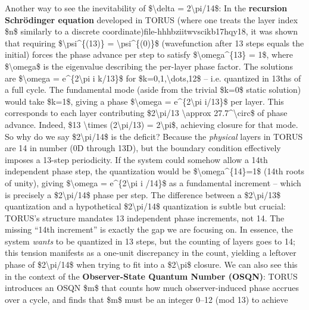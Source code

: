 \documentclass[
]{article}
\begin{document}
Another way to see the inevitability of \$\textbackslash delta =
2\textbackslash pi/14\$: In the \textbf{recursion Schrödinger equation}
developed in TORUS (where one treats the layer index \$n\$ similarly to
a discrete coordinate)\hspace{0pt}file-hhhbziitwvscikb17hqy18, it was
shown that requiring \$\textbackslash psi\^{}\{(13)\} =
\textbackslash psi\^{}\{(0)\}\$ (wavefunction after 13 steps equals the
initial) forces the phase advance per step to satisfy
\$\textbackslash omega\^{}\{13\} = 1\$, where \$\textbackslash omega\$
is the eigenvalue describing the per-layer phase factor\hspace{0pt}. The
solutions are \$\textbackslash omega = e\^{}\{2\textbackslash pi i
k/13\}\$ for \$k=0,1,\textbackslash dots,12\$ -- i.e. quantized in 13ths
of a full cycle. The fundamental mode (aside from the trivial \$k=0\$
static solution) would take \$k=1\$, giving a phase
\$\textbackslash omega = e\^{}\{2\textbackslash pi i/13\}\$ per
layer\hspace{0pt}. This corresponds to each layer contributing
\$2\textbackslash pi/13 \textbackslash approx
27.7\^{}\textbackslash circ\$ of phase advance. Indeed, \$13
\textbackslash times (2\textbackslash pi/13) = 2\textbackslash pi\$,
achieving closure for that mode. So why do we say
\$2\textbackslash pi/14\$ is the deficit? Because the \emph{physical}
layers in TORUS are 14 in number (0D through 13D), but the boundary
condition effectively imposes a 13-step periodicity. If the system could
somehow allow a 14th independent phase step, the quantization would be
\$\textbackslash omega\^{}\{14\}=1\$ (14th roots of unity), giving
\$\textbackslash omega = e\^{}\{2\textbackslash pi i /14\}\$ as a
fundamental increment -- which is precisely a \$2\textbackslash pi/14\$
phase per step. The difference between a \$2\textbackslash pi/13\$
quantization and a hypothetical \$2\textbackslash pi/14\$ quantization
is subtle but crucial: TORUS's structure mandates 13 independent phase
increments, not 14. The missing ``14th increment'' is exactly the gap we
are focusing on. In essence, the system \emph{wants} to be quantized in
13 steps, but the counting of layers goes to 14; this tension manifests
as a one-unit discrepancy in the count, yielding a leftover phase of
\$2\textbackslash pi/14\$ when trying to fit into a
\$2\textbackslash pi\$ closure. We can also see this in the context of
the \textbf{Observer-State Quantum Number (OSQN)}: TORUS introduces an
OSQN \$m\$ that counts how much observer-induced phase accrues over a
cycle, and finds that \$m\$ must be an integer 0--12 (mod 13) to achieve
\end{document}
